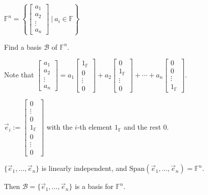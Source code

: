 \documentclass[11pt,fleqn]{book} %
\begin{document}
\begin{example}
{~~~}

    $\mathbb{F}^n = \left\{ \begin{bmatrix} a_1\\a_2\\\vdots\\a_n \end{bmatrix} ~|~a_i \in \mathbb{F} \right\}$
    
    Find a basis $\mathcal{B}$ of $\mathbb{F}^n$. 
    
    Note that $\begin{bmatrix} a_1\\a_2\\\vdots\\a_n \end{bmatrix} = a_1\begin{bmatrix}1_{\mathbb{F}}\\0\\\vdots\\0 \end{bmatrix} + a_2\begin{bmatrix} 0\\1_{\mathbb{F}}\\\vdots\\0 \end{bmatrix} + \cdots + a_n\begin{bmatrix} 0\\0\\\vdots\\1_{\mathbb{F}} \end{bmatrix}$. 
    
    $\vec{e}_i := \begin{bmatrix} 0\\\vdots\\0\\1_{\mathbb{F}}\\0\\\vdots\\0 \end{bmatrix}$ with the $i$-th element $1_\mathbb{F}$ and the rest $0$. 
    
    $\{\vec{e}_1, \dots, \vec{e}_n\}$ is linearly independent, and $\mathrm{Span}\left( \vec{e}_1, \dots, \vec{e}_n \right) = \mathbb{F}^n$. 
    
    Then $\mathcal{B} = \{\vec{e}_1, \dots, \vec{e}_n\} $ is a basis for $\mathbb{F}^n$. 
\end{example}
\end{document}
